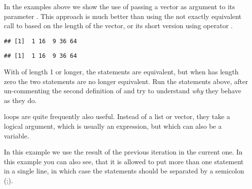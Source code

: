 \documentclass[krantz2]{krantz}\usepackage{knitr}%
\begin{document}
\begin{advplayground}
In the examples above we show the use of  passing a vector as argument to its parameter . This approach is much better than using the not exactly equivalent call to  based on the length of the vector, or its short version using operator \code{:}.

\begin{knitrout}\footnotesize
{}\color{fgcolor}\begin{kframe}
\begin{alltt}
 \hlkwb{<-} \hlstd{(}\hlstd{,} \hlstd{,} \hlstd{,} \hlstd{,} \hlstd{)}

 \hlkwb{<-} \hlstd{(}
  \hlstd{(} 
   \hlkwb{<-} \hlopt{^}
\hlstd{\}}
\end{alltt}
\begin{verbatim}
## [1]  1 16  9 36 64
\end{verbatim}
\begin{alltt}
 \hlkwb{<-} \hlstd{(}
  \hlopt{:}
   \hlkwb{<-} \hlopt{^}
\hlstd{\}}
\end{alltt}
\begin{verbatim}
## [1]  1 16  9 36 64
\end{verbatim}
\end{kframe}
\end{knitrout}

With  of length 1 or longer, the statements are equivalent, but when  has length zero the two statements are no longer equivalent. Run the statements above, after un-commenting the second definition of  and try to understand \emph{why} they behave as they do.
\end{advplayground}

 loops are quite frequently also useful. Instead of a list or vector, they take a logical argument, which is usually an expression, but which can also be a variable.

In this example we use the result of the previous iteration in the current one. In this example you can also see, that it is allowed to put more than one statement in a single line, in which case the statements should be separated by a semicolon (;).
\end{document}

